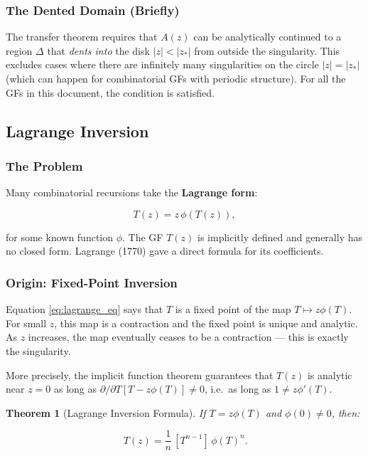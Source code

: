 \documentclass[11pt,a4paper]{article}
\newtheorem{theorem}{Theorem}[section]
\theoremstyle{definition}
\begin{document}
\subsubsection{The Dented Domain (Briefly)}

The transfer theorem requires that $A(z)$ can be analytically continued to a
region $\Delta$ that \emph{dents into} the disk $|z| < |z_*|$ from outside
the singularity. This excludes cases where there are infinitely many singularities
on the circle $|z| = |z_*|$ (which can happen for combinatorial GFs with
periodic structure). For all the GFs in this document, the condition is satisfied.

\subsection{Lagrange Inversion}
\label{sec:lagrange}

\subsubsection{The Problem}

Many combinatorial recursions take the \textbf{Lagrange form}:

\begin{equation}
  T(z) = z\,\phi(T(z)),
  \label{eq:lagrange_eq}
\end{equation}

for some known function $\phi$. The GF $T(z)$ is implicitly defined and generally
has no closed form. Lagrange (1770) gave a direct formula for its coefficients.

\subsubsection{Origin: Fixed-Point Inversion}

Equation \eqref{eq:lagrange_eq} says that $T$ is a fixed point of the map
$T \mapsto z\phi(T)$. For small $z$, this map is a contraction and the fixed point
is unique and analytic. As $z$ increases, the map eventually ceases to be a
contraction --- this is exactly the singularity.

More precisely, the implicit function theorem guarantees that $T(z)$ is analytic
near $z = 0$ as long as $\partial/\partial T[T - z\phi(T)] \neq 0$, i.e.\ as long as
$1 \neq z\phi'(T)$.

\begin{theorem}[Lagrange Inversion Formula]
If $T = z\phi(T)$ and $\phi(0) \neq 0$, then:

\begin{equation}
  [z^n]\,T(z) = \frac{1}{n}\,[T^{n-1}]\,\phi(T)^n.
  \label{eq:lagrange_inversion}
\end{equation}
\end{theorem}
\end{document}
